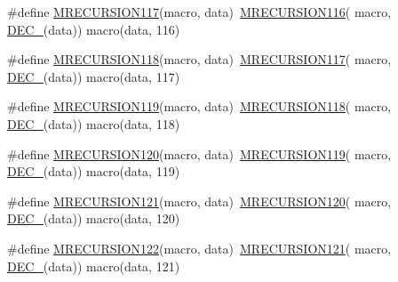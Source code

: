\begin{DoxyCompactItemize}
\item 
\#define \mbox{\hyperlink{group__group__sam0__utils__mrecursion_ga7dd850bf5ab97978f6b7bd1b177d3368}{M\+R\+E\+C\+U\+R\+S\+I\+O\+N117}}(macro,  data)~\mbox{\hyperlink{group__group__sam0__utils__mrecursion_ga32fe65002e3a25cc50fb1344dbada748}{M\+R\+E\+C\+U\+R\+S\+I\+O\+N116}}(  macro, \mbox{\hyperlink{group__group__sam0__utils__mrecursion_ga1d23d683797679dca8c3512a54a5dcae}{D\+E\+C\+\_\+}}(data))   macro(data, 116)
\item 
\#define \mbox{\hyperlink{group__group__sam0__utils__mrecursion_ga8559a2809b8bf465f91a9cf40bb88b16}{M\+R\+E\+C\+U\+R\+S\+I\+O\+N118}}(macro,  data)~\mbox{\hyperlink{group__group__sam0__utils__mrecursion_ga7dd850bf5ab97978f6b7bd1b177d3368}{M\+R\+E\+C\+U\+R\+S\+I\+O\+N117}}(  macro, \mbox{\hyperlink{group__group__sam0__utils__mrecursion_ga1d23d683797679dca8c3512a54a5dcae}{D\+E\+C\+\_\+}}(data))   macro(data, 117)
\item 
\#define \mbox{\hyperlink{group__group__sam0__utils__mrecursion_gadc32038d19a1b3fafd088520e9b5e8d8}{M\+R\+E\+C\+U\+R\+S\+I\+O\+N119}}(macro,  data)~\mbox{\hyperlink{group__group__sam0__utils__mrecursion_ga8559a2809b8bf465f91a9cf40bb88b16}{M\+R\+E\+C\+U\+R\+S\+I\+O\+N118}}(  macro, \mbox{\hyperlink{group__group__sam0__utils__mrecursion_ga1d23d683797679dca8c3512a54a5dcae}{D\+E\+C\+\_\+}}(data))   macro(data, 118)
\item 
\#define \mbox{\hyperlink{group__group__sam0__utils__mrecursion_ga5efb0e5825610432e0101ca6efdcb33d}{M\+R\+E\+C\+U\+R\+S\+I\+O\+N120}}(macro,  data)~\mbox{\hyperlink{group__group__sam0__utils__mrecursion_gadc32038d19a1b3fafd088520e9b5e8d8}{M\+R\+E\+C\+U\+R\+S\+I\+O\+N119}}(  macro, \mbox{\hyperlink{group__group__sam0__utils__mrecursion_ga1d23d683797679dca8c3512a54a5dcae}{D\+E\+C\+\_\+}}(data))   macro(data, 119)
\item 
\#define \mbox{\hyperlink{group__group__sam0__utils__mrecursion_ga4529da10901e76e10423312547ba7a2b}{M\+R\+E\+C\+U\+R\+S\+I\+O\+N121}}(macro,  data)~\mbox{\hyperlink{group__group__sam0__utils__mrecursion_ga5efb0e5825610432e0101ca6efdcb33d}{M\+R\+E\+C\+U\+R\+S\+I\+O\+N120}}(  macro, \mbox{\hyperlink{group__group__sam0__utils__mrecursion_ga1d23d683797679dca8c3512a54a5dcae}{D\+E\+C\+\_\+}}(data))   macro(data, 120)
\item 
\#define \mbox{\hyperlink{group__group__sam0__utils__mrecursion_ga03c32f49f3c98b918cb9924148830594}{M\+R\+E\+C\+U\+R\+S\+I\+O\+N122}}(macro,  data)~\mbox{\hyperlink{group__group__sam0__utils__mrecursion_ga4529da10901e76e10423312547ba7a2b}{M\+R\+E\+C\+U\+R\+S\+I\+O\+N121}}(  macro, \mbox{\hyperlink{group__group__sam0__utils__mrecursion_ga1d23d683797679dca8c3512a54a5dcae}{D\+E\+C\+\_\+}}(data))   macro(data, 121)

\end{DoxyCompactItemize}
